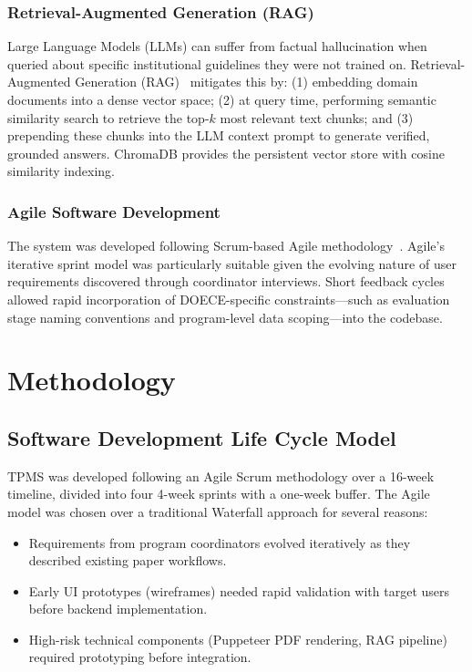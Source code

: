 \documentclass[12pt]{report}
\begin{document}
\subsection{Retrieval-Augmented Generation (RAG)}

Large Language Models (LLMs) can suffer from factual hallucination when queried about specific institutional guidelines they were not trained on. Retrieval-Augmented Generation (RAG)~\citep{lewis2020retrieval} mitigates this by: (1) embedding domain documents into a dense vector space; (2) at query time, performing semantic similarity search to retrieve the top-$k$ most relevant text chunks; and (3) prepending these chunks into the LLM context prompt to generate verified, grounded answers. ChromaDB provides the persistent vector store with cosine similarity indexing.

\subsection{Agile Software Development}

The system was developed following Scrum-based Agile methodology~\citep{schwaber2020scrum}. Agile's iterative sprint model was particularly suitable given the evolving nature of user requirements discovered through coordinator interviews. Short feedback cycles allowed rapid incorporation of DOECE-specific constraints---such as evaluation stage naming conventions and program-level data scoping---into the codebase.

\chapter{Methodology}

\section{Software Development Life Cycle Model}

TPMS was developed following an Agile Scrum methodology over a 16-week timeline, divided into four 4-week sprints with a one-week buffer. The Agile model was chosen over a traditional Waterfall approach for several reasons:

\begin{itemize}[leftmargin=*]
  \item Requirements from program coordinators evolved iteratively as they described existing paper workflows.
  \item Early UI prototypes (wireframes) needed rapid validation with target users before backend implementation.
  \item High-risk technical components (Puppeteer PDF rendering, RAG pipeline) required prototyping before integration.
\end{itemize}
\end{document}
